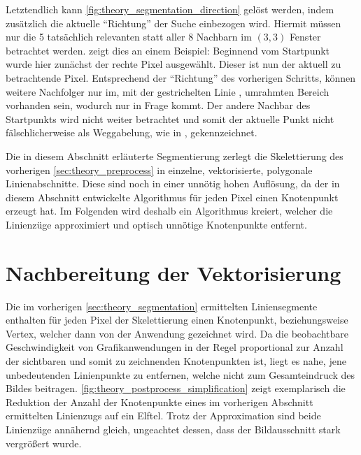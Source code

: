 Letztendlich kann \autoref{fig:theory_segmentation_direction} gelöst werden, indem zusätzlich die aktuelle \enquote{Richtung} der Suche einbezogen wird.
Hiermit müssen nur die 5 tatsächlich relevanten statt aller 8 Nachbarn im \((3,3)\) Fenster betrachtet werden.
 zeigt dies an einem Beispiel:
Beginnend vom Startpunkt  wurde hier zunächst der rechte Pixel  ausgewählt.
Dieser ist nun der aktuell zu betrachtende Pixel.
Entsprechend der \enquote{Richtung} des vorherigen Schritts, können weitere Nachfolger nur im, mit der gestrichelten Linie  , umrahmten Bereich vorhanden sein, wodurch nur \textcolor{gray}{} in Frage kommt.
Der andere Nachbar des Startpunkts \textcolor{gray}{} wird nicht weiter betrachtet und somit der aktuelle Punkt nicht fälschlicherweise als Weggabelung, wie in , gekennzeichnet.

Die in diesem Abschnitt erläuterte Segmentierung zerlegt die Skelettierung des vorherigen \autoref{sec:theory_preprocess} in einzelne, vektorisierte, polygonale Linienabschnitte.
Diese sind noch in einer unnötig hohen Auflösung, da der in diesem Abschnitt entwickelte Algorithmus für jeden Pixel einen Knotenpunkt erzeugt hat.
Im Folgenden wird deshalb ein Algorithmus kreiert, welcher die Linienzüge approximiert und optisch unnötige Knotenpunkte entfernt.

\clearpage
\section{Nachbereitung der Vektorisierung}%
\label{sec:theory_postprocess}

Die im vorherigen \autoref{sec:theory_segmentation} ermittelten Liniensegmente enthalten für jeden Pixel der Skelettierung einen Knotenpunkt, beziehungsweise Vertex, welcher dann von der Anwendung gezeichnet wird.
Da die beobachtbare Geschwindigkeit von Grafikanwendungen in der Regel proportional zur Anzahl der sichtbaren und somit zu zeichnenden Knotenpunkten ist, liegt es nahe, jene unbedeutenden Linienpunkte zu entfernen, welche nicht zum Gesamteindruck des Bildes beitragen.
\autoref{fig:theory_postprocess_simplification} zeigt exemplarisch die Reduktion der Anzahl der Knotenpunkte eines im vorherigen Abschnitt ermittelten Linienzugs auf ein Elftel.
Trotz der Approximation sind beide Linienzüge annähernd gleich, ungeachtet dessen, dass der Bildausschnitt stark vergrößert wurde.

